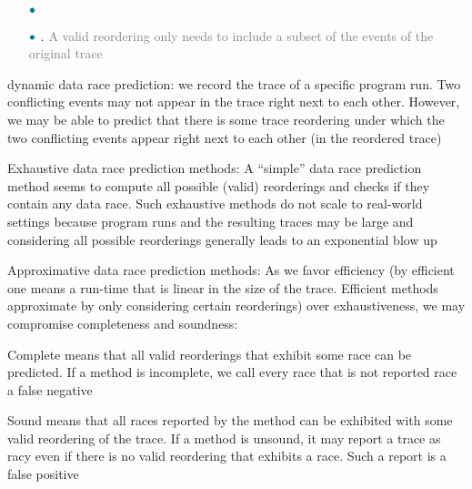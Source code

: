 \documentclass[landscape, a4paper]{article}
\begin{document}
\begin{minipage}[t]{0.2\linewidth}
\begin{betterlist}
\begin{enumerate}
			\item[$\textcolor{PrimaryColor}{\bullet}$] 
			\item[$\textcolor{PrimaryColor}{\bullet}$] . \textcolor{gray}{A valid reordering only needs to include a subset of the events of the original trace}
		\end{enumerate}
		\item \alert{dynamic data race prediction}: we record the trace of a specific program run. Two conflicting events may not appear in the trace right next to each other. However, we may be able to predict that there is some trace reordering under which the two conflicting events appear right next to each other (in the reordered trace)
		\begin{betterlist}
			\item \alert{Exhaustive data race prediction methods:} A \enquote{simple} data race prediction method seems to compute all possible (valid) reorderings and checks if they contain any data race. Such exhaustive methods do not scale to real-world settings because program runs and the resulting traces may be large and considering all possible reorderings generally leads to an \alert{exponential blow up}
			\item \alert{Approximative data race prediction methods:} As we favor efficiency (by efficient one means a run-time that is \alert{linear} in the size of the trace. \alert{Efficient methods} approximate by only considering certain reorderings) over exhaustiveness, we may compromise \alert{completeness} and \alert{soundness}:
			\begin{betterlist}
				\item \alert{Complete} means that all valid reorderings that exhibit some race can be predicted. If a method is \alert{incomplete}, we call every race that is not reported race a \alert{false negative}
				\item \alert{Sound} means that all races reported by the method can be exhibited with some valid reordering of the trace. If a method is \alert{unsound}, it may report a trace as racy even if there is no valid reordering that exhibits a race. Such a report is a \alert{false positive}
			\end{betterlist}
		\end{betterlist}
	\end{betterlist}
\end{minipage}
\end{document}
